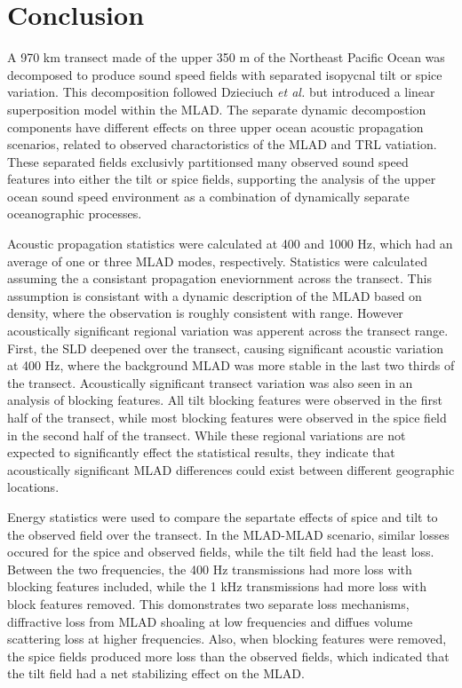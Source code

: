 \documentclass[preprint,NumberedRefs]{JASA}
\begin{document}
\section{Conclusion}\label{sec:conclusion}
A 970 km transect made of the upper 350 m of the Northeast Pacific Ocean was decomposed to produce sound speed fields with separated isopycnal tilt or spice variation. This decomposition followed Dzieciuch \emph{et al.}\citep{dzieciuch2004} but introduced a linear superposition model within the MLAD. The separate dynamic decompostion components have different effects on three upper ocean acoustic propagation scenarios, related to observed charactoristics of the MLAD and TRL vatiation. These separated fields exclusivly partitionsed many observed sound speed features into either the tilt or spice fields, supporting the analysis of the upper ocean sound speed environment as a combination of dynamically separate oceanographic processes.

Acoustic propagation statistics were calculated at 400 and 1000 Hz, which had an average of one or three MLAD modes, respectively. Statistics were calculated assuming the a consistant propagation eneviornment across the transect. This assumption is consistant with a dynamic description of the MLAD based on density\citep{cole2010seasonal}, where the observation is roughly consistent with range. However acoustically significant regional variation was apperent across the transect range. First, the SLD deepened over the transect, causing significant acoustic variation at 400 Hz, where the background MLAD was more stable in the last two thirds of the transect.  Acoustically significant transect variation was also seen in an analysis of blocking features. All tilt blocking features were observed in the first half of the transect, while most blocking features were observed in the spice field in the second half of the transect. While these regional variations are not expected to significantly effect the statistical results, they indicate that acoustically significant MLAD differences could exist between different geographic locations.

Energy statistics were used to compare the separtate effects of spice and tilt to the observed field over the transect. In the MLAD-MLAD scenario, similar losses occured for the spice and observed fields, while the tilt field had the least loss. Between the two frequencies, the 400 Hz transmissions had more loss with blocking features included, while the 1 kHz transmissions had more loss with block features removed. This domonstrates two separate loss mechanisms, diffractive loss from MLAD shoaling at low frequencies and diffues volume scattering loss at higher frequencies\cite{colosi2020observations}. Also, when blocking features were removed, the spice fields produced more loss than the observed fields, which indicated that the tilt field had a net stabilizing effect on the MLAD.
\end{document}

